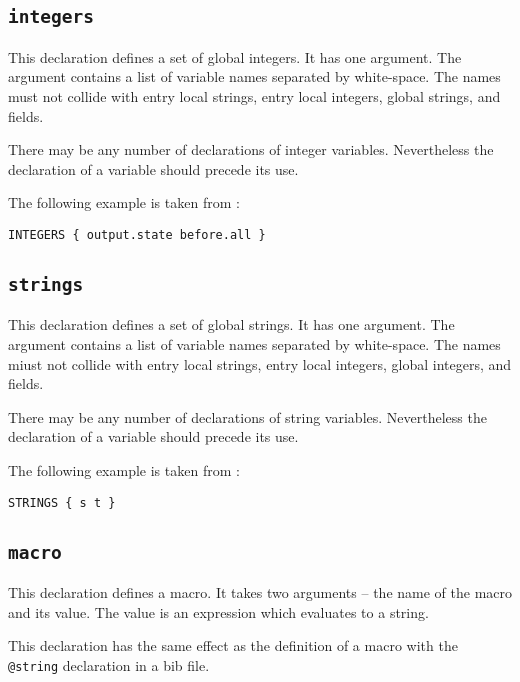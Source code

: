 \subsection{\texttt{integers}}%

This declaration defines a set of global integers. It has one
argument. The argument contains a list of variable names separated by
white-space. The names must not collide with entry local strings,
entry local integers, global strings, and fields.

There may be any number of declarations of integer variables.
Nevertheless the declaration of a variable should precede its use.

The following example is taken from :

\begin{lstlisting}[language=bst]
  INTEGERS { output.state before.all }
\end{lstlisting}


\subsection{\texttt{strings}}

This declaration defines a set of global strings. It has one argument.
The argument contains a list of variable names separated by
white-space. The names miust not collide with entry local strings,
entry local integers, global integers, and fields.

There may be any number of declarations of string variables.
Nevertheless the declaration of a variable should precede its use.

The following example is taken from :

\begin{lstlisting}[language=bst]
  STRINGS { s t }
\end{lstlisting}


\subsection{\texttt{macro}}

This declaration defines a macro. It takes two arguments -- the name
of the macro and its value. The value is an expression which evaluates
to a string.

This declaration has the same effect as the definition of a macro with
the \texttt{@string} declaration in a bib file.

